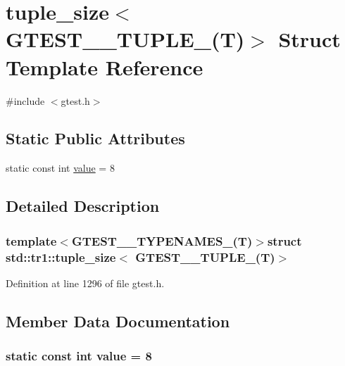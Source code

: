 \hypertarget{structstd_1_1tr1_1_1tuple__size_3_01GTEST__8__TUPLE___07T_08_4}{\section{tuple\-\_\-size$<$ \-G\-T\-E\-S\-T\-\_\-\_\-\-T\-U\-P\-L\-E\-\_\-(\-T)$>$ \-Struct \-Template \-Reference}
\label{dd/d7a/structstd_1_1tr1_1_1tuple__size_3_01GTEST__8__TUPLE___07T_08_4}
}


{\ttfamily \#include $<$gtest.\-h$>$}

\subsection*{\-Static \-Public \-Attributes}
\begin{DoxyCompactItemize}
\item 
static const int \hyperlink{structstd_1_1tr1_1_1tuple__size_3_01GTEST__8__TUPLE___07T_08_4_a3851384a21258869159d444f38396c70}{value} = 8
\end{DoxyCompactItemize}


\subsection{\-Detailed \-Description}
\subsubsection*{template$<$\-G\-T\-E\-S\-T\-\_\-\_\-\-T\-Y\-P\-E\-N\-A\-M\-E\-S\-\_\-(\-T)$>$struct std\-::tr1\-::tuple\-\_\-size$<$ G\-T\-E\-S\-T\-\_\-\_\-\-T\-U\-P\-L\-E\-\_\-(\-T)$>$}



\-Definition at line 1296 of file gtest.\-h.



\subsection{\-Member \-Data \-Documentation}
\hypertarget{structstd_1_1tr1_1_1tuple__size_3_01GTEST__8__TUPLE___07T_08_4_a3851384a21258869159d444f38396c70}{
\subsubsection[{value}]{\setlength{\rightskip}{0pt plus 5cm}static const int {\bf value} = 8}}\label{dd/d7a/structstd_1_1tr1_1_1tuple__size_3_01GTEST__8__TUPLE___07T_08_4_a3851384a21258869159d444f38396c70}



